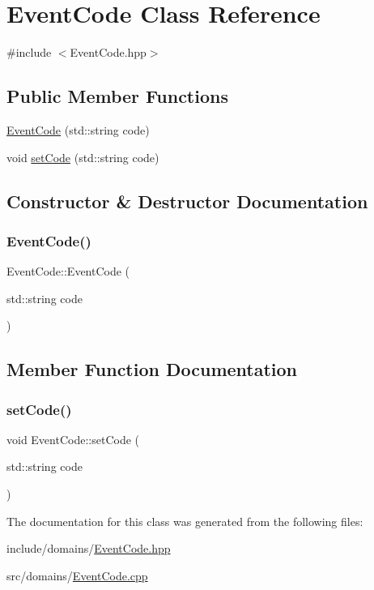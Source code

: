 \hypertarget{class_event_code}{}\section{Event\+Code Class Reference}
\label{class_event_code}


{\ttfamily \#include $<$Event\+Code.\+hpp$>$}

\subsection*{Public Member Functions}
\begin{DoxyCompactItemize}
\item 
\mbox{\hyperlink{class_event_code_a7c33d50827136d4cb628cf48b2113526}{Event\+Code}} (std\+::string code)
\item 
void \mbox{\hyperlink{class_event_code_a355ba0ab9a962fc06707ac7ee732bc8a}{set\+Code}} (std\+::string code)
\end{DoxyCompactItemize}


\subsection{Constructor \& Destructor Documentation}
\mbox{\label{class_event_code_a7c33d50827136d4cb628cf48b2113526}} 
\subsubsection{\texorpdfstring{EventCode()}{EventCode()}}
{\footnotesize\ttfamily Event\+Code\+::\+Event\+Code (\begin{DoxyParamCaption}\item[{std\+::string}]{code }\end{DoxyParamCaption})}



\subsection{Member Function Documentation}
\mbox{\label{class_event_code_a355ba0ab9a962fc06707ac7ee732bc8a}} 
\subsubsection{\texorpdfstring{setCode()}{setCode()}}
{\footnotesize\ttfamily void Event\+Code\+::set\+Code (\begin{DoxyParamCaption}\item[{std\+::string}]{code }\end{DoxyParamCaption})}



The documentation for this class was generated from the following files\+:\begin{DoxyCompactItemize}
\item 
include/domains/\mbox{\hyperlink{_event_code_8hpp}{Event\+Code.\+hpp}}\item 
src/domains/\mbox{\hyperlink{_event_code_8cpp}{Event\+Code.\+cpp}}\end{DoxyCompactItemize}
